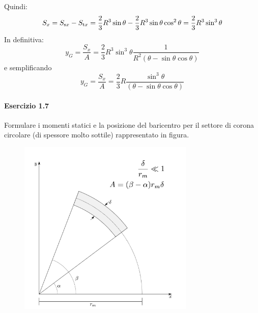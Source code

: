Quindi:
\begin{equation*}
S_x = S_{\textup{s}x}-S_{\textup{t}x} = \frac{2}{3}R^3 \sin\theta - \frac{2}{3}R^3 \sin\theta\cos^{2}\theta = \frac{2}{3}R^3 \sin^{3}\theta
\end{equation*}
In definitiva:
\begin{equation*}
y_G = \frac{S_x}{A} = \frac{2}{3}R^{3}\sin^{3}\theta\frac{1}{R^{2}(\theta-\sin\theta\cos\theta)}
\end{equation*}
e semplificando
\begin{equation*}
y_G = \frac{S_x}{A} = \frac{2}{3}R\frac{\sin^{3}\theta}{(\theta-\sin\theta\cos\theta)}
\end{equation*}
\clearpage
\paragraph{Esercizio 1.7}
Formulare i momenti statici e la posizione del baricentro per il settore di corona circolare (di spessore molto sottile) rappresentato in figura. 
\renewcommand{\thefigure}{1.7~-~1}
\begin{figure}[h]
\centering
\includegraphics[width=0.75\textwidth]{Immagini/Parte_1/Esercizio1_7/Esercizio1_7.pdf}
\caption{}
\label{Esercizio1_7}
\end{figure}

